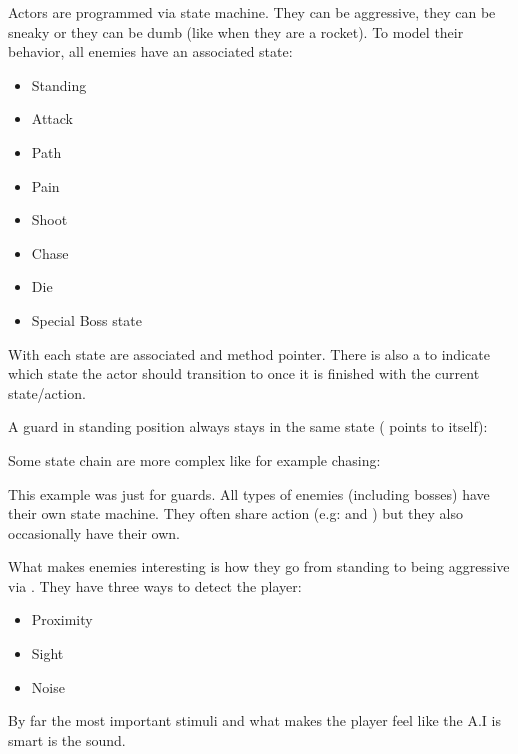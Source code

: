 Actors are programmed via state machine. They can be aggressive, they can be sneaky or they can be dumb (like when they are a rocket). To model their behavior, all enemies have an associated state:
\begin{itemize}
\item Standing
\item Attack
\item Path
\item Pain
\item Shoot
\item Chase
\item Die
\item Special Boss state
\end{itemize}

With each state are associated  and  method pointer. There is also a  to indicate which state the actor should transition to once it is finished with the current state/action.\\
\par
\begin{minipage}{\textwidth}

\end{minipage}
\par


A guard in standing position always stays in the same state ( points to itself):\\
\par

\begin{minipage}{\textwidth}

\end{minipage}
\par
Some state chain are more complex like for example chasing:\\

\par
\begin{minipage}{\textwidth}

\end{minipage}
\par
This example was just for guards. All types of enemies (including bosses) have their own state machine. They often share action (e.g:  and ) but they also occasionally have their own.\\

\par
What makes enemies interesting is how they go from standing to being aggressive via . They have three ways to detect the player:\\
\begin{itemize}
\item Proximity
\item Sight
\item Noise
\end{itemize}
By far the most important stimuli and what makes the player feel like the A.I is smart is the sound.





